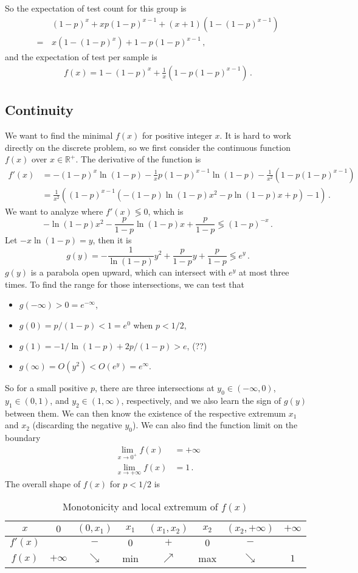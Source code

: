 \documentclass[]{article}
\begin{document}
So the expectation of test count for this group is
\begin{align*}
& (1-p)^x + xp(1-p)^{x - 1} + (x + 1)( 1 - (1-p)^{x - 1}) \\
=\,& x(1-(1-p)^x)  + 1 - p(1-p)^{x - 1}\,,
\end{align*}
and the expectation of test per sample is
\begin{align*}
f(x) = 1-(1-p)^x + \frac{1}{x}(1 - p(1-p)^{x - 1})\,.
\end{align*}
\subsection{Continuity}
We want to find the minimal $f(x)$ for positive integer $x$. It is hard to work directly on the discrete problem, so we first consider the continuous function $f(x)$ over $x \in \mathbb{R}^+$. The derivative of the function is
\begin{align*}
f'(x) &= -(1-p)^x \ln(1-p) - \frac{1}{x}p(1-p)^{x - 1}\ln(1-p) - \frac{1}{x^2}(1 - p(1-p)^{x - 1})\\
&= \frac{1}{x^2}( (1-p)^{x-1}(-(1-p)\ln(1-p)x^2 - p\ln(1-p)x + p) - 1 )\,.
\end{align*}
We want to analyze where $f'(x) \lessgtr 0$, which is
\[
-\ln(1-p)x^2 - \frac{p}{1-p}\ln(1-p)x + \frac{p}{1-p} \lessgtr (1-p)^{-x}\,.
\]
Let $-x\ln(1-p) = y$, then it is 
\[
g(y) = -\frac{1}{\ln(1-p)}y^2 +\frac{p}{1-p}y +\frac{p}{1-p} \lessgtr e^y\,.
\]
$g(y)$ is a parabola open upward, which can intersect with $e^y$ at most three times. To find the range for those intersections, we can test that
\begin{itemize}
	\item $g(-\infty) > 0 = e^{-\infty}$,
	\item $g(0) = p/(1 - p) < 1 = e^0$ when $p < 1/2$, 
	\item $g(1) = -1/\ln(1-p) + 2p/(1-p)> e$, (??)
	\item $g(\infty) = O(y^2) < O(e^y) = e^{\infty}$.
\end{itemize}
So for a small positive $p$, there are three intersections at $y_0\in(-\infty, 0)$, $y_1\in(0, 1)$, and $y_2\in(1, \infty)$, respectively, and we also learn the sign of $g(y)$ between them. We can then know the existence of the respective extremum $x_1$ and $x_2$ (discarding the negative  $y_0$). We can also find the function limit on the boundary
\begin{align*}
\lim_{x\to0^+} f(x) &= +\infty\\
\lim_{x\to+\infty} f(x) &= 1\,.
\end{align*}
The overall shape of $f(x)$ for $p < 1/2$ is
\begin{table}[!h]
	\centering
	\caption{Monotonicity and local extremum of $f(x)$}
	\begin{tabular}{c|ccccccc}
		\hline
		$x$&$0$&$(0, x_1)$&$x_1$&$(x_1, x_2)$&$x_2$&$(x_2, +\infty)$&$+\infty$\\
		\hline
		$f'(x)$&&$-$&$0$&$+$&$0$&$-$&\\
		\hline
		$f(x)$&$+\infty$&$\searrow$&min&$\nearrow$&max&$\searrow$&$1$\\
		\hline
	\end{tabular}
	\label{tab:g}
\end{table}
\end{document}
